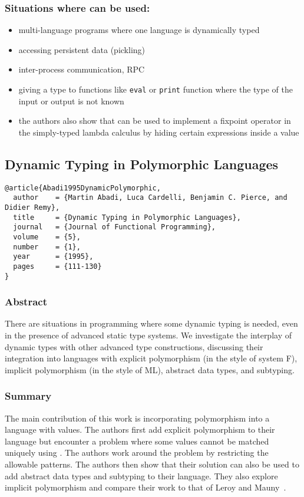 \documentclass[12pt]{article}	%
\begin{document}
\subsubsection*{Situations where \Dynamic can be used:}
\begin{itemize}
	\item multi-language programs where one language is dynamically typed
	\item accessing persistent data (pickling)
	\item inter-process communication, RPC
	\item giving a type to functions like \texttt{eval} or \texttt{print} function where the type of the input or output is not known
	\item the authors also show that \Dynamic can be used to implement a fixpoint operator in the simply-typed lambda calculus by hiding certain expressions inside a \Dynamic value
\end{itemize}






\subsection*{Dynamic Typing in Polymorphic Languages~\cite{Abadi1995DynamicPolymorphic}}

\begin{verbatim}
@article{Abadi1995DynamicPolymorphic,
  author    = {Martin Abadi, Luca Cardelli, Benjamin C. Pierce, and Didier Remy},
  title     = {Dynamic Typing in Polymorphic Languages},
  journal   = {Journal of Functional Programming},
  volume    = {5},
  number    = {1},
  year      = {1995},
  pages     = {111-130}
}
\end{verbatim}

\subsubsection*{Abstract}
There are situations in programming where some dynamic typing is needed, even in the presence of advanced static type systems. We investigate the interplay of dynamic types with other advanced type constructions, discussing their integration into languages with explicit polymorphism (in the style of system F), implicit polymorphism (in the style of ML), abstract data types, and subtyping.

\subsubsection*{Summary}
The main contribution of this work is incorporating polymorphism into a language with \Dynamic values. The authors first add explicit polymorphism to their language but encounter a problem where some \Dynamic values cannot be matched uniquely using \typecase. The authors work around the problem by restricting the allowable \typecase patterns. The authors then show that their solution can also be used to add abstract data types and subtyping to their language. They also explore implicit polymorphism and compare their work to that of Leroy and Mauny~\cite{Leroy1991Dynamics}.
\end{document}
